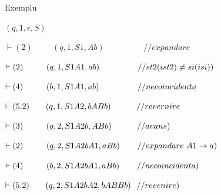 \documentclass[pdf]{beamer}
\begin{document}
\begin{frame}{Exemplu}

$( q, 1, \epsilon ,S )$

$\vdash (2) \hspace{1cm} (q, 1, S1, Ab) \hspace{2cm} //expandare$

$\vdash (2) \hspace{1cm} (q, 1, S1A1, ab) \hspace{1.65cm} //st2(ist2)\neq si(isi)
) $ 

$\vdash (4) \hspace{1cm}(b,1,S1A1, ab) \hspace{1.65cm} //necoincidenta$ 

$\vdash (5.2)\hspace{0.7cm}(q, 1, S1A2, bABb) \hspace{1.1cm} //revernire$ 

$\vdash (3) \hspace{1cm}(q, 2, S1A2b, ABb) \hspace{1.1cm} //avans)$ 

$\vdash (2) \hspace{1cm}(q, 2, S1A2bA1, aBb) \hspace{0.75cm} //expandare \ A1 \to a)$ 

$\vdash (4) \hspace{1cm}(b, 2, S1A2bA1, aBb) \hspace{0.75cm} {//necoincidenta})$ 

$\vdash (5.2) \hspace{0.7cm}(q, 2, S1A2bA2, bABBb) \hspace{0.25cm} {//revenire})$ 

\end{frame}
\end{document}

